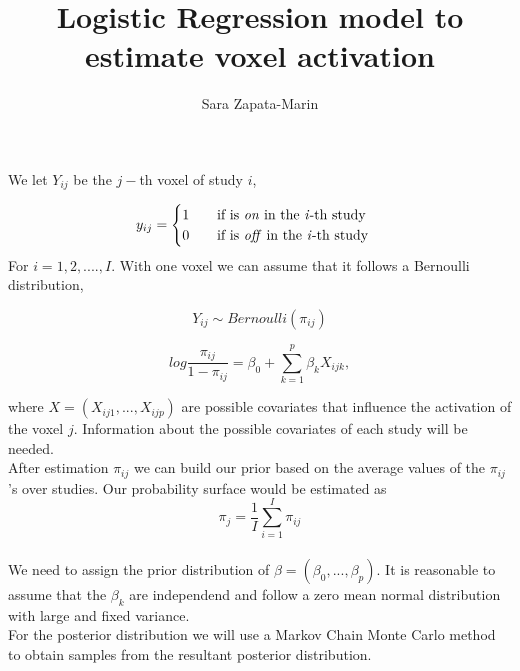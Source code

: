 \documentclass[14pt,a4paper]{article}
\author{Sara Zapata-Marin}
\title{Logistic Regression model to estimate voxel activation}
\begin{document}
\maketitle

We let $Y_{ij}$ be the $j-$th voxel of study $i$,

\[ y_{ij}=
\begin{cases}
      1 \qquad  \text{if is \textit{on} in the \textit{i}-\text{th} study}\\
      0 \qquad  \text{if is \textit{off} in the \textit{i}-\text{th} study}
    \end{cases} \]
For $i=1,2,....,I$.
With one voxel we can assume that it follows a Bernoulli distribution,

\[
Y_{ij} \sim Bernoulli(\pi_{ij})
\]

\[ log\dfrac{\pi_{ij}}{1-\pi_{ij}}= \beta_0+\sum_{k=1}^p \beta_k X_{ijk},\]

where $X=(X_{ij1},...,X_{ijp})$ are possible covariates that influence the activation of the voxel $j$. Information about the possible covariates of each study will be needed.
\\ After estimation $\pi_{ij}$ we can build our prior based on the average values of the $\pi_{ij}$'s over studies. Our probability surface would be estimated as
\[ \pi_j=\dfrac{1}{I}\sum_{i=1}^I \pi_{ij}\]
\\We need to assign the prior distribution of $\beta=(\beta_0,...,\beta_p)$. It is reasonable to assume that the $\beta_k$ are independend and follow a zero mean normal distribution with large and fixed variance. 
\\For the posterior distribution we will use a Markov Chain Monte Carlo method to obtain samples from the resultant posterior distribution.
\end{document}
